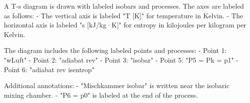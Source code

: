 A T-s diagram is drawn with labeled isobars and processes. The axes are labeled as follows:  
- The vertical axis is labeled "T [K]" for temperature in Kelvin.  
- The horizontal axis is labeled "s [kJ/kg·K]" for entropy in kilojoules per kilogram per Kelvin.  

The diagram includes the following labeled points and processes:  
- Point 1: "wLuft"  
- Point 2: "adiabat rev"  
- Point 3: "isobar"  
- Point 5: "P5 = Pk = p1"  
- Point 6: "adiabat rev isentrop"  

Additional annotations:  
- "Mischkammer isobar" is written near the isobaric mixing chamber.  
- "P6 = p0" is labeled at the end of the process.